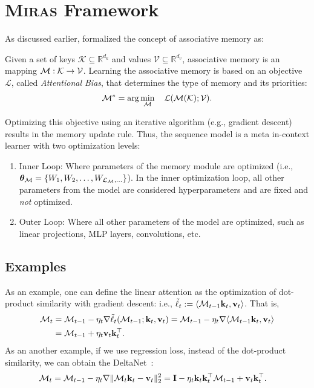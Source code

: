 \section{\textsc{Miras} Framework}\label{app:miras}
As discussed earlier, \citet{behrouz2025Miras} formalized the concept of associative memory as:
\begin{dfn} \label{dfn:associative-memory2}
Given a set of keys $\mathcal{K} \subseteq \mathbb{R}^{d_k}$ and values $\mathcal{V} \subseteq \mathbb{R}^{d_v}$, associative memory is an mapping $\mathcal{M}: \mathcal{K} \rightarrow \mathcal{V}$. Learning the associative memory is based on an objective $\mathcal{L}$, called \emph{Attentional Bias}, that determines the type of memory and its priorities:
\begin{align}\label{eq:attentional-bias-loss2}
    \mathcal{M}^* = \arg\min_{\mathcal{M}}\quad \mathcal{L}(\mathcal{M}(\mathcal{K}); \mathcal{V}).
\end{align}
\end{dfn}
Optimizing this objective using an iterative algorithm (e.g., gradient descent) results in the memory update rule. Thus, the sequence model is a meta in-context learner with two  optimization levels:
\begin{enumerate}
    \item \textcolor{c3}{Inner Loop}: Where parameters of the memory module are optimized (i.e., $\boldsymbol{\theta}_{\mathcal{M}} = \{W_1, W_2, \dots, W_{\mathcal{L}_{\mathcal{M}}, \dots}\}$). In the inner optimization loop, all other parameters from the model are considered hyperparameters and are fixed and \emph{not} optimized.   
    \item \textcolor{c3}{Outer Loop}: Where all other parameters of the model are optimized, such as linear projections, MLP layers, convolutions, etc. 
\end{enumerate}


\subsection{Examples}
As an example, one can define the linear attention as the optimization of dot-product similarity with gradient descent: i.e., $\tilde{\ell}_t := \langle \mathcal{M}_{t-1} \mathbf{k}_t, \mathbf{v}_t \rangle$. That is,
\begin{align}
    \mathcal{M}_t &= \mathcal{M}_{t-1} - \eta_t \nabla  \tilde{\ell}_t(\mathcal{M}_{t-1}; \mathbf{k}_t, \mathbf{v}_t) = \mathcal{M}_{t-1} - \eta_t \nabla  \langle \mathcal{M}_{t-1} \mathbf{k}_t, \mathbf{v}_t \rangle \\
    &= \mathcal{M}_{t-1} + \eta_t \mathbf{v}_t \mathbf{k}_t^{\top}.
\end{align}
As an another example, if we use regression loss, instead of the dot-product similarity, we can obtain the DeltaNet~\citep{schlag2021linear}:
\begin{align}
    \mathcal{M}_t &= \mathcal{M}_{t-1}  - \eta_t \nabla \| \mathcal{M}_t \mathbf{k}_t - \mathbf{v}_t \|^{2}_2 = \mathbf{I} - \eta_t \mathbf{k}_t \mathbf{k}_t^{\top} \mathcal{M}_{t-1} + \mathbf{v}_t \mathbf{k}_t^{\top}.
\end{align}
